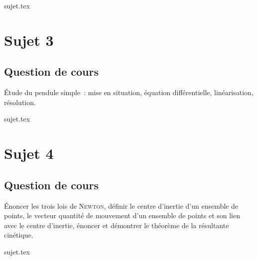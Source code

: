 \documentclass[a4paper, 11pt]{book}
\begin{document}
\resetQ
{sujet.tex}


\chapter{Sujet 3}
\section{Question de cours}

Étude du pendule simple~: mise en situation, équation différentielle,
linéarisation, résolution.

\resetQ
{sujet.tex}

\chapter{Sujet 4}
\section{Question de cours}

Énoncer les trois lois de \textsc{Newton}, définir le centre d'inertie d'un
ensemble de points, le vecteur quantité de mouvement d'un ensemble de points et
son lien avec le centre d'inertie, énoncer et démontrer le théorème de la
résultante cinétique.
    
\resetQ
{sujet.tex}

\label{LastPage}
\end{document}
